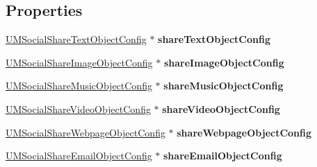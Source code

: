 \subsection*{Properties}
\begin{DoxyCompactItemize}
\item 
\mbox{\label{interface_u_m_social_handler_config_abbbd9a5da755e8e8a68e582f9c615e21}} 
\mbox{\hyperlink{interface_u_m_social_share_text_object_config}{U\+M\+Social\+Share\+Text\+Object\+Config}} $\ast$ {\bfseries share\+Text\+Object\+Config}
\item 
\mbox{\label{interface_u_m_social_handler_config_a2b9d7ee9c54c28e535798ad84851f656}} 
\mbox{\hyperlink{interface_u_m_social_share_image_object_config}{U\+M\+Social\+Share\+Image\+Object\+Config}} $\ast$ {\bfseries share\+Image\+Object\+Config}
\item 
\mbox{\label{interface_u_m_social_handler_config_a237d84634e80c50fb2b44cbed28de612}} 
\mbox{\hyperlink{interface_u_m_social_share_music_object_config}{U\+M\+Social\+Share\+Music\+Object\+Config}} $\ast$ {\bfseries share\+Music\+Object\+Config}
\item 
\mbox{\label{interface_u_m_social_handler_config_a71209eab8fe1ae0b60dbc0b14c135e9d}} 
\mbox{\hyperlink{interface_u_m_social_share_video_object_config}{U\+M\+Social\+Share\+Video\+Object\+Config}} $\ast$ {\bfseries share\+Video\+Object\+Config}
\item 
\mbox{\label{interface_u_m_social_handler_config_a07d76de904b54a5c77e471b40525cb51}} 
\mbox{\hyperlink{interface_u_m_social_share_webpage_object_config}{U\+M\+Social\+Share\+Webpage\+Object\+Config}} $\ast$ {\bfseries share\+Webpage\+Object\+Config}
\item 
\mbox{\label{interface_u_m_social_handler_config_a50563bfdf86d36cf03308b86b7b20682}} 
\mbox{\hyperlink{interface_u_m_social_share_email_object_config}{U\+M\+Social\+Share\+Email\+Object\+Config}} $\ast$ {\bfseries share\+Email\+Object\+Config}
\item 
\mbox{\label{interface_u_m_social_handler_config_a59b50c5cd6ef65121d75d9baa9850a8a}} 

\end{DoxyCompactItemize}
